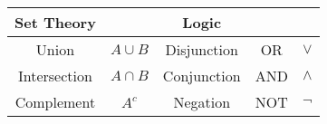 \documentclass[lecture]{csm}
\begin{document}
\begin{center}
\begin{tabular}{|c|c||c|c|c|} \hline
Set Theory 		& 			& Logic			&		& \\ \hline
Union			& $A\cup B$	& Disjunction 	& OR 	& $\lor$	\\
Intersection		& $A\cap B$	& Conjunction	& AND 	& $\land$\\
Complement		& $A^c$		& Negation		& NOT 	& $\lnot$	\\ \hline
\end{tabular}
\end{center}

%
%
%
\end{document}

